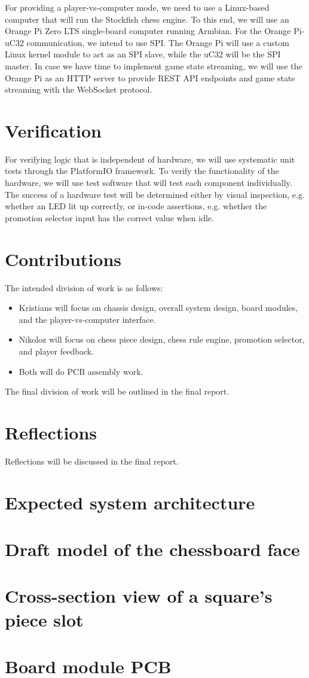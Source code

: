 \documentclass{article}
\begin{document}
For providing a player-vs-computer mode, we need to use a Linux-based computer that will run the Stockfish chess engine. To this end, we will use an Orange Pi Zero LTS single-board computer running Armbian. For the Orange Pi-uC32 communication, we intend to use SPI. The Orange Pi will use a custom Linux kernel module to act as an SPI slave, while the uC32 will be the SPI master. In case we have time to implement game state streaming, we will use the Orange Pi as an HTTP server to provide REST API endpoints and game state streaming with the WebSocket protocol.

\section{Verification}

For verifying logic that is independent of hardware, we will use systematic unit tests through the PlatformIO framework. To verify the functionality of the hardware, we will use test software that will test each component individually. The success of a hardware test will be determined either by visual inspection, e.g. whether an LED lit up correctly, or in-code assertions, e.g. whether the promotion selector input has the correct value when idle.

\section{Contributions}

The intended division of work is as follows:
\begin{itemize}
	\item Kristians will focus on chassis design, overall system design, board modules, and the player-vs-computer interface.
	\item Nikoloz will focus on chess piece design, chess rule engine, promotion selector, and player feedback.
	\item Both will do PCB assembly work.
\end{itemize}

The final division of work will be outlined in the final report.

\section{Reflections}

Reflections will be discussed in the final report.

\begin{appendices}
	\section{Expected system architecture}
	\section{Draft model of the chessboard face}
	\section{Cross-section view of a square's piece slot}
	\section{Board module PCB}
\end{appendices}
\end{document}

